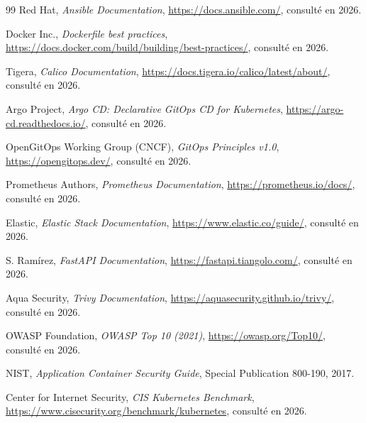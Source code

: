 \documentclass[12pt,a4paper,oneside]{report}
\makeatletter
\renewcommand{\chaptername}{Chapitre}
\def\cleardoublepage{\clearpage\if@twoside
  \ifodd\c@page\else\hbox{}\thispagestyle{empty}\newpage\fi\fi}
\makeatother
\begin{document}
\begin{thebibliography}{99}
 Red Hat, \emph{Ansible Documentation},
\url{https://docs.ansible.com/}, consulté en 2026.

 Docker Inc., \emph{Dockerfile best practices},
\url{https://docs.docker.com/build/building/best-practices/}, consulté en 2026.

 Tigera, \emph{Calico Documentation},
\url{https://docs.tigera.io/calico/latest/about/}, consulté en 2026.

 Argo Project, \emph{Argo CD: Declarative GitOps CD for Kubernetes},
\url{https://argo-cd.readthedocs.io/}, consulté en 2026.

 OpenGitOps Working Group (CNCF),
\emph{GitOps Principles v1.0}, \url{https://opengitops.dev/}, consulté en 2026.

 Prometheus Authors, \emph{Prometheus Documentation},
\url{https://prometheus.io/docs/}, consulté en 2026.

 Elastic, \emph{Elastic Stack Documentation},
\url{https://www.elastic.co/guide/}, consulté en 2026.

 S. Ramírez, \emph{FastAPI Documentation},
\url{https://fastapi.tiangolo.com/}, consulté en 2026.

 Aqua Security, \emph{Trivy Documentation},
\url{https://aquasecurity.github.io/trivy/}, consulté en 2026.

 OWASP Foundation, \emph{OWASP Top 10 (2021)},
\url{https://owasp.org/Top10/}, consulté en 2026.

 NIST, \emph{Application Container Security Guide},
Special Publication 800-190, 2017.

 Center for Internet Security,
\emph{CIS Kubernetes Benchmark}, \url{https://www.cisecurity.org/benchmark/kubernetes},
consulté en 2026.

\end{thebibliography}

\cleardoublepage

\appendix
\renewcommand{\chaptername}{Annexe}
\renewcommand{\cftchappresnum}{Annexe }
\addtolength{\cftchapnumwidth}{3.2em}

\end{document}
